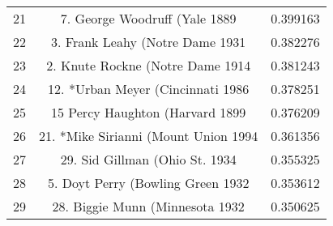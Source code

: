 \documentclass{mcmthesis}
\begin{document}
\begin{appendices}
\begin{longtable}{ccc}
    21    & 7. George Woodruff (Yale 1889 & 0.399163 \\
    22    & 3. Frank Leahy (Notre Dame 1931 & 0.382276 \\
    23    & 2. Knute Rockne (Notre Dame 1914 & 0.381243 \\
    24    & 12. *Urban Meyer (Cincinnati 1986 & 0.378251 \\
    25    & 15  Percy Haughton (Harvard 1899 & 0.376209 \\
    26    & 21. *Mike Sirianni (Mount Union 1994 & 0.361356 \\
    27    & 29. Sid Gillman (Ohio St. 1934 & 0.355325 \\
    28    & 5. Doyt Perry (Bowling Green 1932 & 0.353612 \\
    29    & 28. Biggie Munn (Minnesota 1932 & 0.350625 \\
\end{longtable}



\end{appendices}
\end{document}
